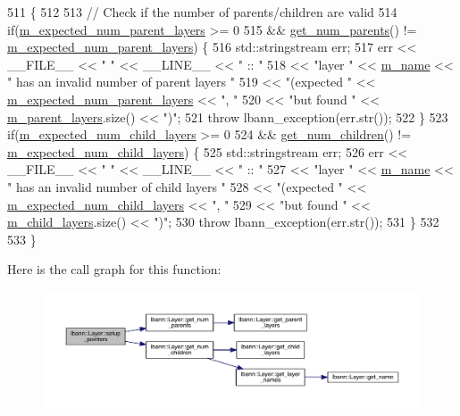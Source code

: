 \begin{DoxyCode}
511                            \{
512 
513   \textcolor{comment}{// Check if the number of parents/children are valid}
514   \textcolor{keywordflow}{if}(\hyperlink{classlbann_1_1Layer_a841b96b25555247f52921c7f13ae1dfa}{m\_expected\_num\_parent\_layers} >= 0
515      && \hyperlink{classlbann_1_1Layer_ac9290d4a6453ccda5f6b4d8b57b49ba3}{get\_num\_parents}() != \hyperlink{classlbann_1_1Layer_a841b96b25555247f52921c7f13ae1dfa}{m\_expected\_num\_parent\_layers}) \{
516     std::stringstream err;
517     err << \_\_FILE\_\_ << \textcolor{stringliteral}{" "} << \_\_LINE\_\_ << \textcolor{stringliteral}{" :: "}
518         << \textcolor{stringliteral}{"layer "} << \hyperlink{classlbann_1_1Layer_aa47109ad09b399142fa92f9d3702189f}{m\_name} << \textcolor{stringliteral}{" has an invalid number of parent layers "}
519         << \textcolor{stringliteral}{"(expected "} << \hyperlink{classlbann_1_1Layer_a841b96b25555247f52921c7f13ae1dfa}{m\_expected\_num\_parent\_layers} << \textcolor{stringliteral}{", "}
520         << \textcolor{stringliteral}{"but found "} << \hyperlink{classlbann_1_1Layer_a3fa7c6cf1a22bb14ab0e85e3dc6027c5}{m\_parent\_layers}.size() << \textcolor{stringliteral}{")"};
521     \textcolor{keywordflow}{throw} lbann\_exception(err.str());
522   \}
523   \textcolor{keywordflow}{if}(\hyperlink{classlbann_1_1Layer_ac08f133dddd150319650e220ab9a523a}{m\_expected\_num\_child\_layers} >= 0
524      && \hyperlink{classlbann_1_1Layer_a1409a117c31a7ea4f2c7a4d22a3e86c3}{get\_num\_children}() != \hyperlink{classlbann_1_1Layer_ac08f133dddd150319650e220ab9a523a}{m\_expected\_num\_child\_layers}) \{
525     std::stringstream err;
526     err << \_\_FILE\_\_ << \textcolor{stringliteral}{" "} << \_\_LINE\_\_ << \textcolor{stringliteral}{" :: "}
527         << \textcolor{stringliteral}{"layer "} << \hyperlink{classlbann_1_1Layer_aa47109ad09b399142fa92f9d3702189f}{m\_name} << \textcolor{stringliteral}{" has an invalid number of child layers "}
528         << \textcolor{stringliteral}{"(expected "} << \hyperlink{classlbann_1_1Layer_ac08f133dddd150319650e220ab9a523a}{m\_expected\_num\_child\_layers} << \textcolor{stringliteral}{", "}
529         << \textcolor{stringliteral}{"but found "} << \hyperlink{classlbann_1_1Layer_ae348c0d2b4d05f74d809d09debb633c0}{m\_child\_layers}.size() << \textcolor{stringliteral}{")"};
530     \textcolor{keywordflow}{throw} lbann\_exception(err.str());
531   \}
532 
533 \}
\end{DoxyCode}
Here is the call graph for this function\+:\nopagebreak
\begin{figure}[H]
\begin{center}
\leavevmode
\includegraphics[width=350pt]{classlbann_1_1Layer_a71b7a62afd9b73c23b2c0267b8ba0981_cgraph}
\end{center}
\end{figure}
